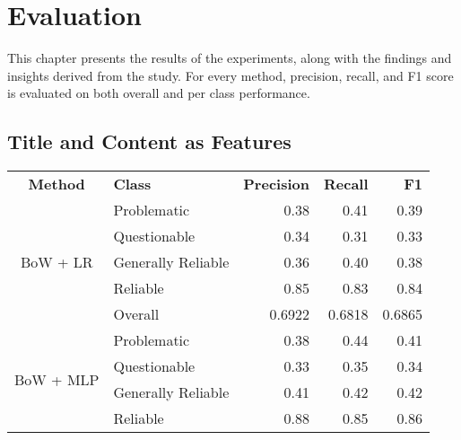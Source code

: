 \chapter{Evaluation}
\label{cha:5}


This chapter presents the results of the experiments, along with the findings and insights derived from the study. For every method, precision, recall, and F1 score is evaluated on both overall and per class performance.

\section{Title and Content as Features}

\begin{table}[htbp]
    \centering
    \scriptsize
    \begin{longtable}{| c | l | r | r | r |}
        \hline                            \textbf{Method} & \textbf{Class}     & \textbf{Precision} & \textbf{Recall} & \textbf{F1}     \\\cline{1-5}
        \multirow{5}{*}{BoW + LR}                         & Problematic        & 0.38               & 0.41            & 0.39            \\
                                                          & Questionable       & 0.34               & 0.31            & 0.33            \\
                                                          & Generally Reliable & 0.36               & 0.40            & 0.38            \\
                                                          & Reliable           & 0.85               & 0.83            & 0.84            \\\cline{2-5}
                                                          & Overall            & 0.6922             & 0.6818          & 0.6865          \\
        \hline
        \multirow{5}{*}{BoW + MLP}                        & Problematic        & 0.38               & 0.44            & 0.41            \\
                                                          & Questionable       & 0.33               & 0.35            & 0.34            \\
                                                          & Generally Reliable & 0.41               & 0.42            & 0.42            \\
                                                          & Reliable           & 0.88               & 0.85            & 0.86            \\\cline{2-5}

\end{longtable}
\end{table}
